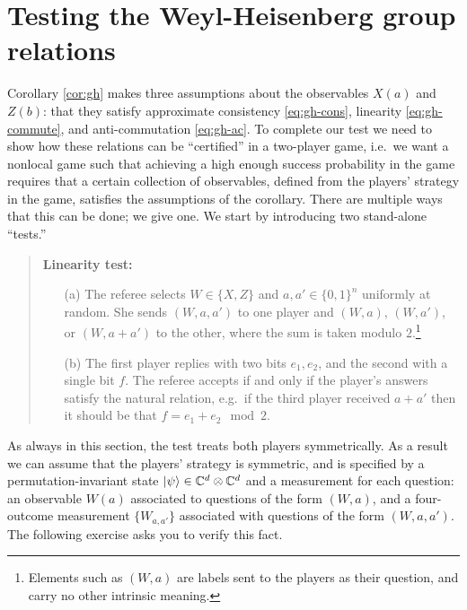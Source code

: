 \section{Testing the Weyl-Heisenberg group relations}
\label{sec:wh-test}



Corollary \ref{cor:gh} makes three assumptions about the observables $X(a)$ and $Z(b)$: that they satisfy approximate consistency \eqref{eq:gh-cons}, linearity \eqref{eq:gh-commute}, and anti-commutation \eqref{eq:gh-ac}. To complete our test we need to show how these relations can be ``certified'' in a two-player game, i.e.\ we want a nonlocal game such that achieving a high enough success probability in the game requires that a certain collection of observables, defined from the players' strategy in the game, satisfies the assumptions of the corollary. There are multiple ways that this can be done; we give one. We start by introducing two stand-alone ``tests.''

\begin{quote}
\textbf{Linearity test:}
\begin{itemize}
\item[(a)] The referee selects $W\in\{X,Z\}$ and $a,a'\in\{0,1\}^n$ uniformly at random. She sends $(W,a,a')$ to one player and $(W,a)$, $(W,a')$, or $(W,a+a')$ to the other, where the sum is taken modulo $2$.\footnote{Elements such as $(W,a)$ are labels sent to the players as their question, and carry no other intrinsic meaning.} 
\item[(b)] The first player replies with two bits $e_1,e_2$, and the second with a single bit $f$. The referee accepts if and only if the player's answers satisfy the natural relation, e.g.\ if the third player received $a+a'$ then it should be that $f=e_1+e_2\mod 2$. 
\end{itemize}
\end{quote}

As always in this section, the test treats both players symmetrically. As a result we can assume that the players' strategy is symmetric, and is specified by a permutation-invariant state $|\psi\rangle\in \mathbb{C}^d \otimes \mathbb{C}^d$ and a measurement for each question: an observable $W(a)$ associated to questions of the form $(W,a)$, and a four-outcome measurement $\{W_{a,a'}\}$ associated with questions of the form $(W,a,a')$. The following exercise asks you to verify this fact. 

